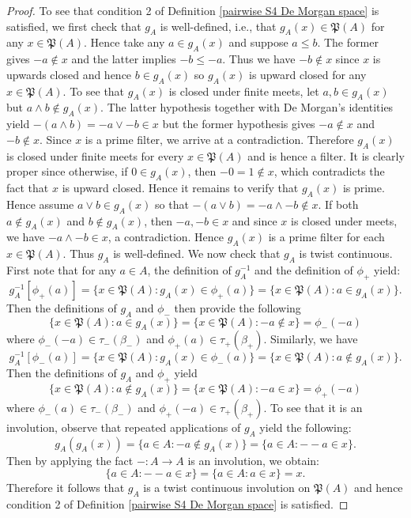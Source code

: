 \documentclass{amsart}
\theoremstyle{plain}
\theoremstyle{definition}
\begin{document}
\begin{proof}
    To see that condition 2 of Definition \ref{pairwise S4 De Morgan space} is satisfied, we first check that $g_A$ is well-defined, i.e., that $g_A(x)\in\mathfrak{P}(A)$ for any $x\in\mathfrak{P}(A)$. Hence take any $a\in g_A(x)$ and suppose $a\leq b$. The former gives $-a\not\in x$ and the latter implies $-b\leq-a$. Thus we have $-b\not\in x$ since $x$ is upwards closed and hence $b\in g_A(x)$ so $g_A(x)$ is upward closed for any $x\in\mathfrak{P}(A)$. To see that $g_A(x)$ is closed under finite meets, let $a,b\in g_A(x)$ but $a\wedge b\not\in g_A(x)$. The latter hypothesis together with De Morgan's identities yield $-(a\wedge b)=-a\vee -b\in x$ but the former hypothesis gives $-a\not\in x$ and $-b\not\in x$. Since $x$ is a prime filter, we arrive at a contradiction. Therefore $g_A(x)$ is closed under finite meets for every $x\in\mathfrak{P}(A)$ and is hence a filter. It is clearly proper since otherwise, if $0\in g_A(x)$, then $-0=1\not\in x$, which contradicts the fact that $x$ is upward closed. Hence it remains to verify that $g_A(x)$ is prime. Hence assume $a\vee b\in g_A(x)$ so that $-(a\vee b)=-a\wedge-b\not\in x$. If both $a\not\in g_A(x)$ and $b\not\in g_A(x)$, then $-a,-b\in x$ and since $x$ is closed under meets, we have $-a\wedge-b\in x$, a contradiction. Hence $g_A(x)$ is a prime filter for each $x\in\mathfrak{P}(A)$. Thus $g_A$ is well-defined. We now check that $g_A$ is twist continuous. First note that for any $a\in A$, the definition of $g_A^{-1}$ and the definition of $\phi_+$ yield:  
    \[g_A^{-1}[\phi_+(a)]=\{x\in\mathfrak{P}(A):g_A(x)\in\phi_+(a)\}=\{x\in\mathfrak{P}(A):a\in g_A(x)\}.\]
Then the definitions of $g_A$ and $\phi_-$ then provide the following
\[\{x\in\mathfrak{P}(A):a\in g_A(x)\}=\{x\in\mathfrak{P}(A):-a\not\in x\}=\phi_-(-a)\] where $\phi_-(-a)\in\tau_-(\beta_-)$ and $\phi_+(a)\in\tau_+(\beta_+)$. Similarly, we have 
    \[g_A^{-1}[\phi_-(a)]=\{x\in\mathfrak{P}(A):g_A(x)\in\phi_-(a)\}=\{x\in\mathfrak{P}(A):a\not\in g_A(x)\}.\] Then the definitions of $g_A$ and $\phi_+$ yield 
\[\{x\in\mathfrak{P}(A):a\not\in g_A(x)\}=\{x\in\mathfrak{P}(A):-a\in x\}=\phi_+(-a)\] where $\phi_-(a)\in\tau_-(\beta_-)$ and $\phi_+(-a)\in\tau_+(\beta_+)$. To see that it is an involution, observe that repeated applications of $g_A$ yield the following: 
    \[g_A(g_A(x))=\{a\in A:-a\not\in g_A(x)\}=\{a\in A:--a\in x\}.\] Then by applying the fact $-\colon A\to A$ is an involution, we obtain: 
    \[\{a\in A:--a\in x\}=\{a\in A:a\in x\}=x.\]
Therefore it follows that $g_A$ is a twist continuous involution on $\mathfrak{P}(A)$ and hence condition 2 of Definition \ref{pairwise S4 De Morgan space} is satisfied. 




\end{proof}
\end{document}
